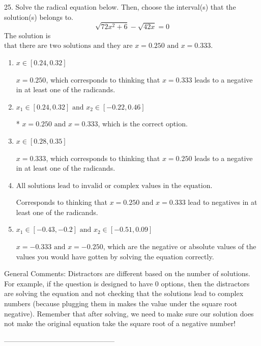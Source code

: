 \documentclass{extbook}[14pt]
\begin{document}
25. Solve the radical equation below. Then, choose the interval(s) that the solution(s) belongs to.
\[ \sqrt{72 x^2 + 6} - \sqrt{42 x} = 0 \] 
The solution is $ \text{that there are two solutions and they are } x = 0.250 \text{ and } x = 0.333. $ 

\begin{enumerate}[label=\Alph*.] 
\item $ x \in [0.24,0.32] $ 

 $x = 0.250$, which corresponds to thinking that $x = 0.333$ leads to a negative in at least one of the radicands. 
\item $ x_1 \in [0.24, 0.32] \text{ and } x_2 \in [-0.22,0.46] $ 

 * $x = 0.250 \text{ and } x = 0.333$, which is the correct option. 
\item $ x \in [0.28,0.35] $ 

 $x = 0.333$, which corresponds to thinking that $x = 0.250$ leads to a negative in at least one of the radicands. 
\item $ \text{All solutions lead to invalid or complex values in the equation.} $ 

 Corresponds to thinking that $x = 0.250 \text{ and } x = 0.333$ lead to negatives in at least one of the radicands. 
\item $ x_1 \in [-0.43, -0.2] \text{ and } x_2 \in [-0.51,0.09] $ 

 $x = -0.333 \text{ and } x = -0.250$, which are the negative or absolute values of the values you would have gotten by solving the equation correctly. 
\end{enumerate} 
 
General Comments: Distractors are different based on the number of solutions. For example, if the question is designed to have 0 options, then the distractors are solving the equation and not checking that the solutions lead to complex numbers (because plugging them in makes the value under the square root negative). Remember that after solving, we need to make sure our solution does not make the original equation take the square root of a negative number!

-----------------------------------------------
\end{document}
